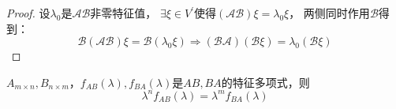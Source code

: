 \begin{proof}
  设$\lambda_0$是$\mathcal{A}\mathcal{B}$非零特征值，
  $\exists \xi \in V^{\prime}$使得$(\mathcal{A}\mathcal{B})\xi = \lambda_0 \xi$，
  两侧同时作用$\mathcal{B}$得到：
  \begin{equation*}
    \mathcal{B}(\mathcal{A}\mathcal{B})\xi = \mathcal{B}(\lambda_0 \xi) \Rightarrow (\mathcal{B}\mathcal{A})(\mathcal{B}\xi) = \lambda_0(\mathcal{B} \xi)
  \end{equation*}
\end{proof}

\begin{theorem}[Sylvester公式]
  $A_{m \times n} ,B_{n \times m}$，$f_{AB}(\lambda), f_{BA}(\lambda)$是$AB,BA$的特征多项式，则
  \begin{equation*}
    \lambda^nf_{AB}(\lambda) = \lambda^m f_{BA}(\lambda)
  \end{equation*}
\end{theorem}

